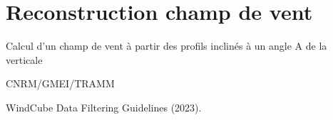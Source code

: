 %
\section{Reconstruction champ de vent}

 

Calcul d'un champ de vent \`a partir des profils inclin\'es \`a un angle A de la verticale

\bigskip





CNRM/GMEI/TRAMM

WindCube Data Filtering Guidelines (2023).
